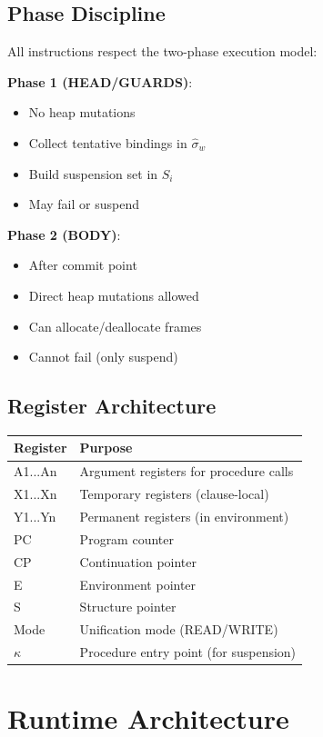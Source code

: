 \documentclass[runningheads,thm-restate]{llncs}
\begin{document}
\subsection{Phase Discipline}

All instructions respect the two-phase execution model:

\textbf{Phase 1 (HEAD/GUARDS)}: 
\begin{itemize}
\item No heap mutations
\item Collect tentative bindings in $\hat{\sigma}_w$
\item Build suspension set in $S_i$
\item May fail or suspend
\end{itemize}

\textbf{Phase 2 (BODY)}: 
\begin{itemize}
\item After commit point
\item Direct heap mutations allowed
\item Can allocate/deallocate frames
\item Cannot fail (only suspend)
\end{itemize}

\subsection{Register Architecture}

\begin{center}
\begin{tabular}{ll}
\hline
\textbf{Register} & \textbf{Purpose} \\
\hline
A1...An & Argument registers for procedure calls \\
X1...Xn & Temporary registers (clause-local) \\
Y1...Yn & Permanent registers (in environment) \\
PC & Program counter \\
CP & Continuation pointer \\
E & Environment pointer \\
S & Structure pointer \\
Mode & Unification mode (READ/WRITE) \\
$\kappa$ & Procedure entry point (for suspension) \\
\hline
\end{tabular}
\end{center}

\section{Runtime Architecture}\label{appendix:runtime-architecture}
\end{document}

